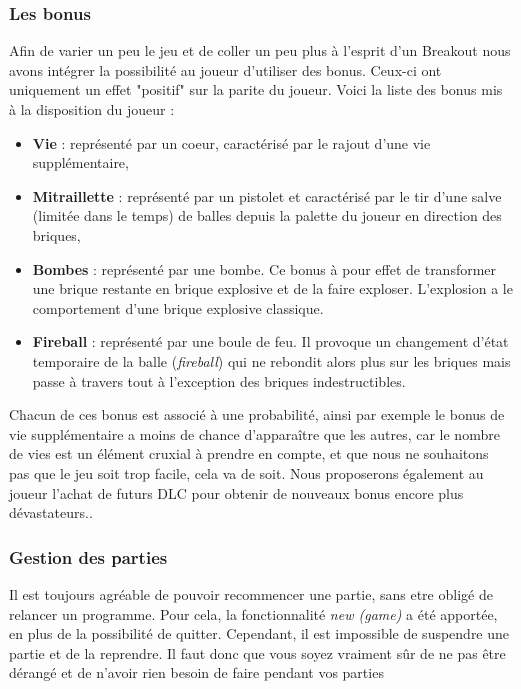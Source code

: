 \documentclass[a4paper,10pt]{article}
\begin{document}
    \subsubsection{Les bonus}
        Afin de varier un peu le jeu et de coller un peu plus à l'esprit d'un Breakout nous avons intégrer la possibilité au joueur
        d'utiliser des bonus. Ceux-ci ont uniquement un effet "positif" sur la parite du joueur. Voici la liste des bonus mis
        à la disposition du joueur :
        \begin{itemize}
            \item \textbf{Vie} : représenté par un coeur, caractérisé par le rajout d'une vie supplémentaire,
            \item \textbf{Mitraillette} : représenté par un pistolet et caractérisé par le tir d'une salve (limitée dans le temps)
            de balles depuis
            la palette du joueur en direction des briques,
            \item \textbf{Bombes} : représenté par une bombe. Ce bonus à pour effet de transformer une brique restante
            en brique explosive et de la faire exploser. L'explosion a le comportement d'une brique explosive classique.
            \item \textbf{Fireball} : représenté par une boule de feu. Il provoque un changement d'état temporaire de la balle (\textit{fireball})
            qui ne 	rebondit alors plus sur les briques mais passe à travers tout à l'exception des briques indestructibles.
        \end{itemize}

        Chacun de ces bonus est associé à une probabilité, ainsi  par exemple le bonus de vie supplémentaire a moins
        de chance d'apparaître que les autres, car le nombre de vies est un élément cruxial à prendre
        en compte, et que nous ne souhaitons pas que le jeu soit trop facile, cela va de soit.
        Nous proposerons également au joueur l'achat de futurs DLC pour obtenir de nouveaux bonus encore plus dévastateurs..

    \subsubsection{Gestion des parties}
        Il est toujours agréable de pouvoir recommencer une partie, sans etre obligé de relancer un
        programme. Pour cela, la fonctionnalité \textit{new (game)} a été apportée, en plus de la
        possibilité de quitter. Cependant, il est impossible de suspendre une partie et de la reprendre.
        Il faut donc que vous soyez vraiment sûr de ne pas être dérangé et de n'avoir rien besoin de faire pendant vos parties \\
\end{document}
